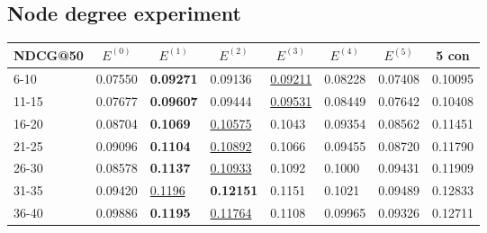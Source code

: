 \subsection{Node degree experiment}

\begin{table*}[]
    \begin{tabular}{|l|l|l|l|l|l|l||l|}
        \hline
        NDCG@50 & \multicolumn{1}{c|}{$E^{(0)}$} & \multicolumn{1}{c|}{$E^{(1)}$} & \multicolumn{1}{c|}{$E^{(2)}$} & \multicolumn{1}{c|}{$E^{(3)}$} & \multicolumn{1}{c|}{$E^{(4)}$} & \multicolumn{1}{c||}{$E^{(5)}$} & \multicolumn{1}{c|}{5 con} \\ \hline
        6-10    & 0.07550                        & \textbf{0.09271}               & 0.09136                        & \underline{0.09211}            & 0.08228                        & 0.07408                         & 0.10095                    \\ \hline
        11-15   & 0.07677                        & \textbf{0.09607}               & 0.09444                        & \underline{0.09531}            & 0.08449                        & 0.07642                         & 0.10408                    \\ \hline
        16-20   & 0.08704                        & \textbf{0.1069}                & \underline{0.10575}            & 0.1043                         & 0.09354                        & 0.08562                         & 0.11451                    \\ \hline
        21-25   & 0.09096                        & \textbf{0.1104}                & \underline{0.10892}            & 0.1066                         & 0.09455                        & 0.08720                         & 0.11790                    \\ \hline
        26-30   & 0.08578                        & \textbf{0.1137}                & \underline{0.10933}            & 0.1092                         & 0.1000                         & 0.09431                         & 0.11909                    \\ \hline
        31-35   & 0.09420                        & \underline{0.1196}             & \textbf{0.12151}               & 0.1151                         & 0.1021                         & 0.09489                         & 0.12833                    \\ \hline
        36-40   & 0.09886                        & \textbf{0.1195}                & \underline{0.11764}            & 0.1108                         & 0.09965                        & 0.09326                         & 0.12711                    \\ \hline

\end{tabular}
\end{table*}
